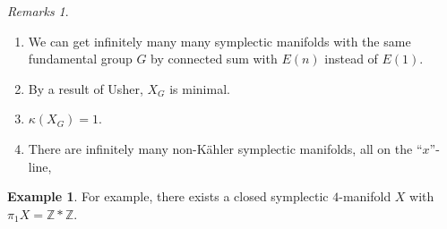 \documentclass[leqno, openany]{memoir}
\theoremstyle{definition}
\newtheorem{exm}[thm]{Example}
\theoremstyle{remark}
\newtheorem{rmks}[thm]{Remarks}
\theoremstyle{plain}
\theoremstyle{definition}
\theoremstyle{remark}
\newcommand{\Z}{\mathbb{Z}}
\begin{document}
    \begin{rmks}
        \begin{enumerate}
            \item We can get infinitely many many symplectic manifolds with the same fundamental group $G$ by connected sum with $E(n)$ instead of $E(1)$.
            \item By a result of Usher, $X_G$ is minimal.
            \item $\kappa (X_G) = 1$.
            \item There are infinitely many non-K\"ahler symplectic manifolds, all on the ``$x$''-line,
        \end{enumerate}
    \end{rmks}

    \begin{exm}
        For example, there exists a closed symplectic $4$-manifold $X$ with $\pi_1 X = \Z * \Z$.
    \end{exm}
    


    
    
    
\end{document}
